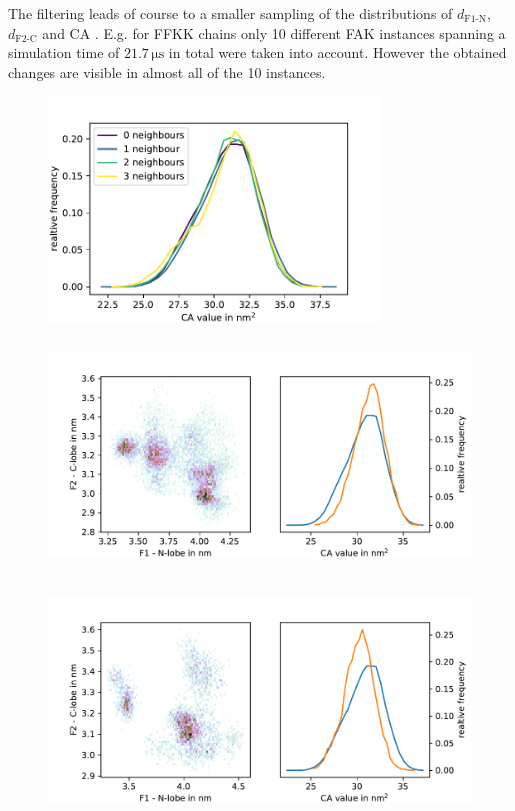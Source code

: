 The filtering leads of course to a smaller sampling of the distributions of $d_\text{F1-N}$, $d_\text{F2-C}$ and CA . E.g. for FFKK chains only 10 different FAK instances spanning a simulation time of $21.7\,\si{\micro\second}$ in total were taken into account. However the obtained changes are visible in almost all of the 10 instances.
%
%
%
\begin{figure}
	\centering
	\includegraphics[height=6cm]{figures/results/nng_ca}
	\label{mult:nng_ca}
\end{figure}
%
%
%
%
%
%
\begin{figure}
	\centering
	\includegraphics[height=6cm]{figures/results/fk_ca}
	\label{mult:fk_ca}
\end{figure}
%
%
%
%
%
%
%
\begin{figure}
	\centering
	\includegraphics[height=6cm]{figures/results/ff_ca}
	\label{mult:ff_ca}
\end{figure}
%
%
%
%

